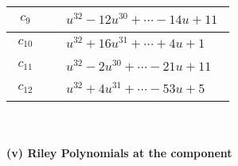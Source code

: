 \documentclass[1p]{elsarticle_modified}
\theoremstyle{definition}
\begin{document}
\begin{tabular}{m{50pt}|m{274pt}}
\hline $$\begin{aligned}c_{9}\end{aligned}$$&$\begin{aligned}
&u^{32}-12 u^{30}+\cdots-14 u+11
\end{aligned}$\\
\hline $$\begin{aligned}c_{10}\end{aligned}$$&$\begin{aligned}
&u^{32}+16 u^{31}+\cdots+4 u+1
\end{aligned}$\\
\hline $$\begin{aligned}c_{11}\end{aligned}$$&$\begin{aligned}
&u^{32}-2 u^{30}+\cdots-21 u+11
\end{aligned}$\\
\hline $$\begin{aligned}c_{12}\end{aligned}$$&$\begin{aligned}
&u^{32}+4 u^{31}+\cdots-53 u+5
\end{aligned}$\\
\hline
\end{tabular}\\~\\
\newpage\renewcommand{\arraystretch}{1}
\flushleft \textbf{(v) Riley Polynomials at the component}\newline \\
\end{document}

